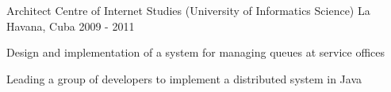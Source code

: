 \begin{cventries}

\cventry
{Architect} %
{Centre of Internet Studies (University of Informatics Science)} %
{La Havana, Cuba} %
{2009 - 2011} %
{ %
\begin{cvitems}
\item {Design and implementation of a system for managing queues at service offices}
\item {Leading a group of developers to implement a distributed system in Java}
\end{cvitems}
}


\end{cventries}
